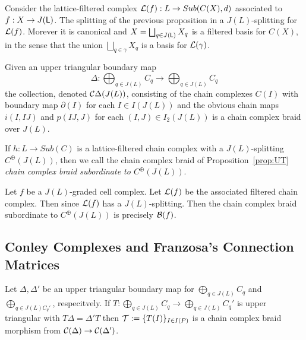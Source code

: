 Consider the lattice-filtered complex ${\mathcal L}(f):L\to Sub(C(X),d)$ associated to $f:X\to J({\mathsf L})$.  The splitting of the previous proposition in a $J(L)$-splitting for ${\mathcal L}(f)$.  Morever it is canonical and $X=\bigsqcup_{q\in J({\mathsf L})} X_q$ is a filtered basis for $C(X)$, in the sense that the union $\bigsqcup_{q\in \gamma} X_q$ is a basis for ${\mathcal L}(\gamma)$.



\begin{prop}\label{prop:UT}
Given an upper triangular boundary map $$\Delta:\bigoplus_{q\in J(L)} C_q\to \bigoplus_{q\in J(L)} C_q$$ the collection, denoted ${\mathcal C}\Delta(J(L))$, consisting of the chain complexes $C(I)$ with boundary map $\partial(I)$ for each $I\in I(J(L))$ and the obvious chain maps $i(I,IJ)$ and $p(IJ,J)$ for each $(I,J)\in I_2(J(L))$ is a chain complex braid over $J(L)$.
\end{prop}

If $h:L\to Sub(C)$ is a lattice-filtered chain complex with a $J(L)$-splitting $C^\oplus(J(L))$, then we call the chain complex braid of Proposition~\ref{prop:UT} {\em chain complex braid subordinate to $C^\oplus(J(L))$}.

\begin{lem}
Let $f$ be a $J(L)$-graded cell complex.  Let ${\mathcal L}(f)$ be the associated filtered chain complex.  Then since ${\mathcal L}(f)$ has a $J(L)$-splitting.  Then the chain complex braid subordinate to $C^\oplus(J(L))$ is precisely ${\mathcal B}(f)$.
\end{lem}


\subsection{Conley Complexes and Franzosa's Connection Matrices}


\begin{prop}\label{prop:UTMap}
Let $\Delta,\Delta'$ be an upper triangular boundary map for $\bigoplus_{q\in J(L)} C_q$ and $\bigoplus_{q\in J(L) C_q'}$, respecitvely.  If $T:\bigoplus_{q\in J(L)} C_q\to \bigoplus_{q\in J(L)} C_q'$ is upper triangular with $T\Delta = \Delta'T$ then ${\mathcal T}:=\{T(I)\}_{I\in I(P)}$ is a chain complex braid morphism from ${\mathcal C}(\Delta)\to {\mathcal C}(\Delta')$.
\end{prop}



